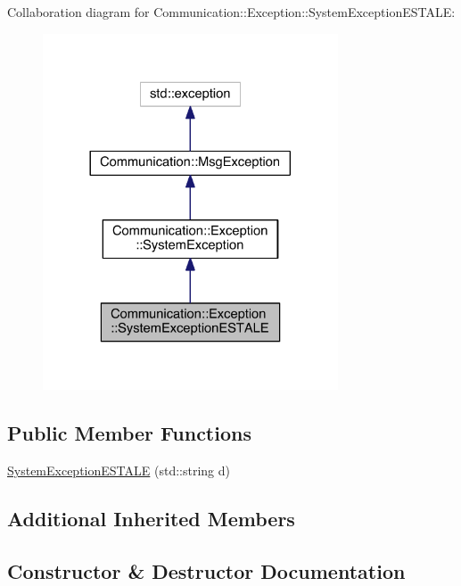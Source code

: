 Collaboration diagram for Communication\+:\+:Exception\+:\+:System\+Exception\+E\+S\+T\+A\+L\+E\+:\nopagebreak
\begin{figure}[H]
\begin{center}
\leavevmode
\includegraphics[width=248pt]{class_communication_1_1_exception_1_1_system_exception_e_s_t_a_l_e__coll__graph}
\end{center}
\end{figure}
\subsection*{Public Member Functions}
\begin{DoxyCompactItemize}
\item 
\hyperlink{class_communication_1_1_exception_1_1_system_exception_e_s_t_a_l_e_a8c133bdef7174b772cf4ca3499cd93ec}{System\+Exception\+E\+S\+T\+A\+L\+E} (std\+::string d)
\end{DoxyCompactItemize}
\subsection*{Additional Inherited Members}


\subsection{Constructor \& Destructor Documentation}
\hypertarget{class_communication_1_1_exception_1_1_system_exception_e_s_t_a_l_e_a8c133bdef7174b772cf4ca3499cd93ec}{}

